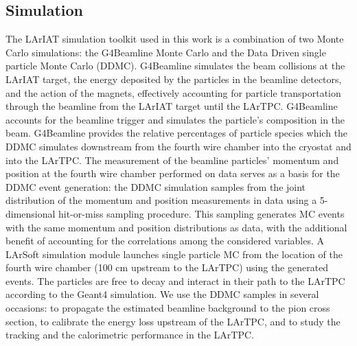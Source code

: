 \documentclass[aps,prl,twocolumn,showpacs,superscriptaddress,groupedaddress]{revtex4}  %
\begin{document}
\subsection{\label{sec:Simulation}Simulation}
The LArIAT simulation toolkit used in this work is a combination of two Monte Carlo simulations: the G4Beamline Monte Carlo  \cite{G4Beamline} and the Data Driven single particle Monte Carlo (DDMC).  G4Beamline simulates the beam collisions at the LArIAT target, the energy deposited by the particles in the beamline detectors, and the action of the magnets, effectively accounting for particle transportation through the beamline from the LArIAT target until the LArTPC. G4Beamline accounts for the beamline trigger and simulates the particle's composition in the beam. G4Beamline provides the relative percentages of particle species which the DDMC simulates downstream from the fourth wire chamber into the cryostat and into the LArTPC.  The measurement of the beamline particles' momentum and position at the fourth wire chamber performed on data serves as a basis for the DDMC event generation: the DDMC simulation samples from the joint distribution of the momentum and position measurements in data using a 5-dimensional hit-or-miss sampling procedure. This sampling generates MC events  with the same momentum and position distributions as data, with the additional benefit of accounting for the correlations among the considered variables. A LArSoft simulation module launches single particle MC from the location of the fourth wire chamber (100 cm upstream to the LArTPC) using the generated events. The particles are free to decay and interact in their path to the LArTPC according to the Geant4 simulation. We use the DDMC samples in several occasions: to propagate the estimated beamline background to the pion cross section, to calibrate the energy loss upstream of the LArTPC,  and to study the tracking and the calorimetric performance  in the LArTPC. 
\end{document}
